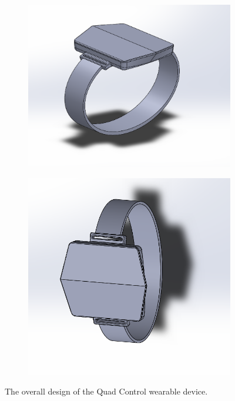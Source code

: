 \documentclass[12pt,letterpaper]{article}
\begin{document}
\begin{figure}
	\centering
	\begin{subfigure}{.5\textwidth}
		\centering
		\includegraphics[width=1\linewidth]{CaptureV1.png}
		\label{fig:sub1}
	\end{subfigure}%
	\begin{subfigure}{.5\textwidth}
		\centering
		\includegraphics[width=1\linewidth]{CaptureV5.png}
		\label{fig:sub2}
	\end{subfigure}
	\caption{The overall design of the Quad Control wearable device.}
	\label{fig:test}
\end{figure}
\end{document}
